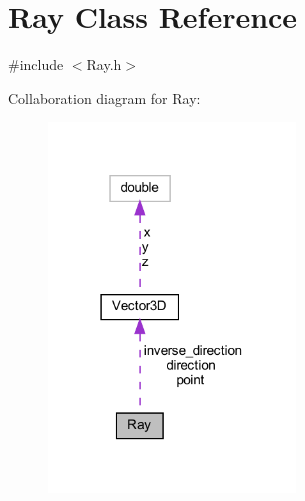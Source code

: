 \hypertarget{classRay}{}\section{Ray Class Reference}
\label{classRay}


{\ttfamily \#include $<$Ray.\+h$>$}



Collaboration diagram for Ray\+:
\nopagebreak
\begin{figure}[H]
\begin{center}
\leavevmode
\includegraphics[width=186pt]{classRay__coll__graph}
\end{center}
\end{figure}
